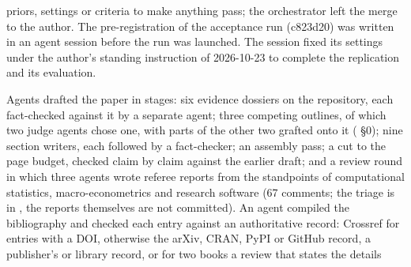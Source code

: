 \begin{description}
priors, settings or criteria to make anything pass; the orchestrator left the merge to the author.
The pre-registration of the acceptance run (c823d20) was written in an agent session before the run
was launched.
The session fixed its settings under the author's standing instruction of 2026-10-23 to complete the
replication and its evaluation.
\item[This paper.] Agents drafted the paper in stages: six evidence dossiers on the repository, each
fact-checked against it by a separate agent; three competing outlines, of which two judge agents
chose one, with parts of the other two grafted onto it ( \S0); nine
section writers, each followed by a fact-checker; an assembly pass; a cut to the page budget, checked
claim by claim against the earlier draft; and a review round in which three agents wrote referee
reports from the standpoints of computational statistics, macro-econometrics and research software
(67 comments; the triage is in , the reports themselves are not
committed).
An agent compiled the bibliography and checked each entry against an authoritative record: Crossref
for entries with a DOI, otherwise the arXiv, CRAN, PyPI or GitHub record, a publisher's or library
record, or for two books a review that states the details

\end{description}

